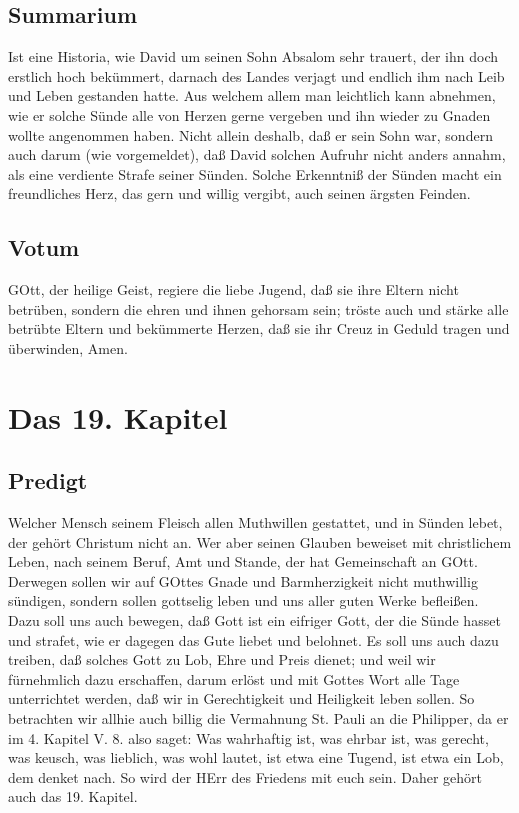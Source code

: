 \section{Summarium}

Ist eine Historia, wie David um seinen Sohn Absalom sehr trauert, der ihn doch erstlich hoch bekümmert, darnach des Landes verjagt und endlich ihm nach Leib und Leben gestanden hatte. Aus welchem allem man leichtlich kann abnehmen, wie er solche Sünde alle von Herzen gerne vergeben und ihn wieder zu Gnaden wollte angenommen haben. Nicht allein deshalb, daß er sein Sohn war, sondern auch darum (wie vorgemeldet), daß David solchen Aufruhr nicht anders annahm, als eine verdiente Strafe seiner Sünden. Solche Erkenntniß der Sünden macht ein freundliches Herz, das gern und willig vergibt, auch seinen ärgsten Feinden.

\section{Votum}

GOtt, der heilige Geist, regiere die liebe Jugend, daß sie ihre Eltern nicht betrüben, sondern die ehren und ihnen gehorsam sein; tröste auch und stärke alle betrübte Eltern und bekümmerte Herzen, daß sie ihr Creuz in Geduld tragen und überwinden, Amen.

\chapter{Das 19. Kapitel}

\section{Predigt}

Welcher Mensch seinem Fleisch allen Muthwillen gestattet, und in Sünden lebet, der gehört Christum nicht an. Wer aber seinen Glauben beweiset mit christlichem Leben, nach seinem Beruf, Amt und Stande, der hat Gemeinschaft an GOtt. Derwegen sollen wir auf GOttes Gnade und Barmherzigkeit nicht muthwillig sündigen, sondern sollen gottselig leben und uns aller guten Werke befleißen. Dazu soll uns auch bewegen, daß Gott ist ein eifriger Gott, der die Sünde hasset und strafet, wie er dagegen das Gute liebet und belohnet. Es soll uns auch dazu treiben, daß solches Gott zu Lob, Ehre und Preis dienet; und weil wir fürnehmlich dazu erschaffen, darum erlöst und mit Gottes Wort alle Tage unterrichtet werden, daß wir in Gerechtigkeit und Heiligkeit leben sollen. So betrachten wir allhie auch billig die Vermahnung St. Pauli an die Philipper, da er im 4. Kapitel V. 8. also saget: Was wahrhaftig ist, was ehrbar ist, was gerecht, was keusch, was lieblich, was wohl lautet, ist etwa eine Tugend, ist etwa ein Lob, dem denket nach. So wird der HErr des Friedens mit euch sein. Daher gehört auch das 19. Kapitel.

